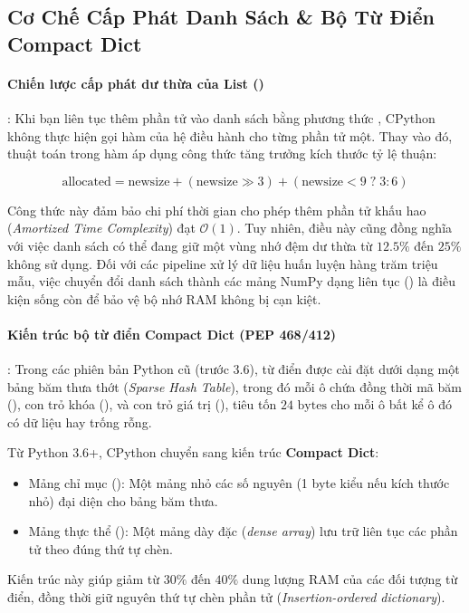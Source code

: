 \subsection{Cơ Chế Cấp Phát Danh Sách \& Bộ Từ Điển Compact Dict}

\paragraph{Chiến lược cấp phát dư thừa của List ()}:
Khi bạn liên tục thêm phần tử vào danh sách bằng phương thức , CPython không thực hiện gọi hàm  của hệ điều hành cho từng phần tử một. Thay vào đó, thuật toán trong hàm  áp dụng công thức tăng trưởng kích thước tỷ lệ thuận:

\begin{equation}
\text{allocated} = \text{newsize} + (\text{newsize} \gg 3) + (\text{newsize} < 9 \; ? \; 3 : 6)
\label{eq:list-overallocation}
\end{equation}

Công thức này đảm bảo chi phí thời gian cho phép thêm phần tử khấu hao (\textit{Amortized Time Complexity}) đạt $\mathcal{O}(1)$. Tuy nhiên, điều này cũng đồng nghĩa với việc danh sách có thể đang giữ một vùng nhớ đệm dư thừa từ $12.5\%$ đến $25\%$ không sử dụng. Đối với các pipeline xử lý dữ liệu huấn luyện hàng trăm triệu mẫu, việc chuyển đổi danh sách thành các mảng NumPy dạng liên tục () là điều kiện sống còn để bảo vệ bộ nhớ RAM không bị cạn kiệt.

\paragraph{Kiến trúc bộ từ điển Compact Dict (PEP 468/412)}:
Trong các phiên bản Python cũ (trước 3.6), từ điển được cài đặt dưới dạng một bảng băm thưa thớt (\textit{Sparse Hash Table}), trong đó mỗi ô chứa đồng thời mã băm (), con trỏ khóa (), và con trỏ giá trị (), tiêu tốn $24\text{ bytes}$ cho mỗi ô bất kể ô đó có dữ liệu hay trống rỗng.

Từ Python 3.6+, CPython chuyển sang kiến trúc \textbf{Compact Dict}:
\begin{itemize}
  \item Mảng chỉ mục (): Một mảng nhỏ các số nguyên (1 byte kiểu  nếu kích thước nhỏ) đại diện cho bảng băm thưa.
  \item Mảng thực thể (): Một mảng dày đặc (\textit{dense array}) lưu trữ liên tục các phần tử  theo đúng thứ tự chèn.
\end{itemize}
Kiến trúc này giúp giảm từ $30\%$ đến $40\%$ dung lượng RAM của các đối tượng từ điển, đồng thời giữ nguyên thứ tự chèn phần tử (\textit{Insertion-ordered dictionary}).

